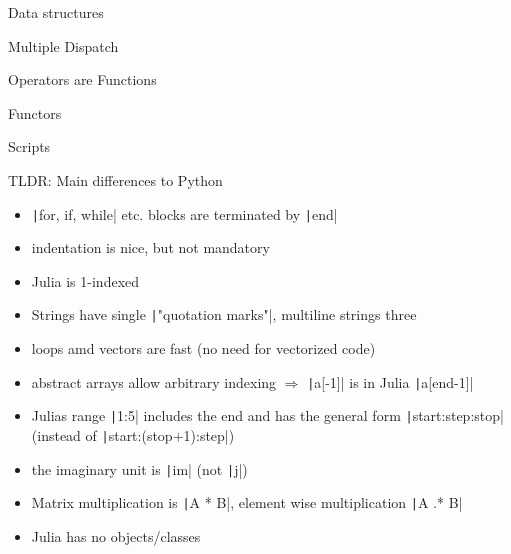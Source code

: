 \documentclass[aspectratio=169, 12pt]{beamer}
\begin{document}
    \begin{frame}[fragile]{Data structures}
    \end{frame}
    \begin{frame}{Multiple Dispatch}
    \end{frame}
    \begin{frame}{Operators are Functions}
    \end{frame}
    \begin{frame}{Functors}
    \end{frame}
    \begin{frame}{Scripts}
    \end{frame}
    \begin{frame}[fragile]{TLDR: Main differences to Python}
        \begin{itemize}
            \item \texttt|for, if, while| etc. blocks are terminated by  \texttt|end|
            \item indentation is nice, but not mandatory
            \item \alert{Julia is 1-indexed}
            \item Strings have single \texttt|"quotation marks"|, multiline strings three
            \pause
            \item loops amd vectors are fast (no need for vectorized code)
            \item abstract arrays allow arbitrary indexing $\Rightarrow$ \texttt|a[-1]| is in Julia \texttt|a[end-1]|
            \item Julias range \texttt|1:5| includes the end and has the general form \texttt|start:step:stop| (instead of \texttt|start:(stop+1):step|)
            \item the imaginary unit is \texttt|im| (not \texttt|j|)
            \pause
            \item Matrix multiplication is \texttt|A * B|, element wise multiplication \texttt|A .* B|
            \item Julia has no objects/classes
        \end{itemize}
    \end{frame}
\end{document}
